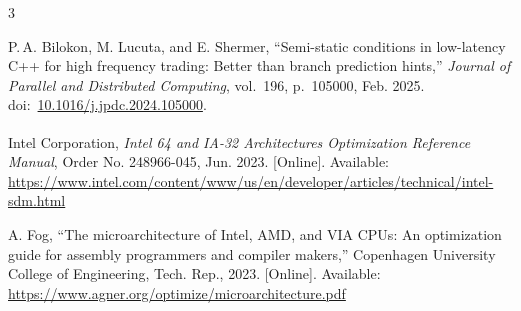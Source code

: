 \begin{thebibliography}{3}

P.\,A. Bilokon, M. Lucuta, and E. Shermer, ``Semi-static conditions in low-latency C++ for high frequency trading: Better than branch prediction hints,'' \emph{Journal of Parallel and Distributed Computing}, vol.~196, p.~105000, Feb. 2025. doi:~\href{https://doi.org/10.1016/j.jpdc.2024.105000}{10.1016/j.jpdc.2024.105000}.

Intel Corporation, \emph{Intel\textsuperscript{\textregistered} 64 and IA-32 Architectures Optimization Reference Manual}, Order No. 248966-045, Jun. 2023. [Online]. Available: \url{https://www.intel.com/content/www/us/en/developer/articles/technical/intel-sdm.html}

A. Fog, ``The microarchitecture of Intel, AMD, and VIA CPUs: An optimization guide for assembly programmers and compiler makers,'' Copenhagen University College of Engineering, Tech. Rep., 2023. [Online]. Available: \url{https://www.agner.org/optimize/microarchitecture.pdf}

\end{thebibliography}

